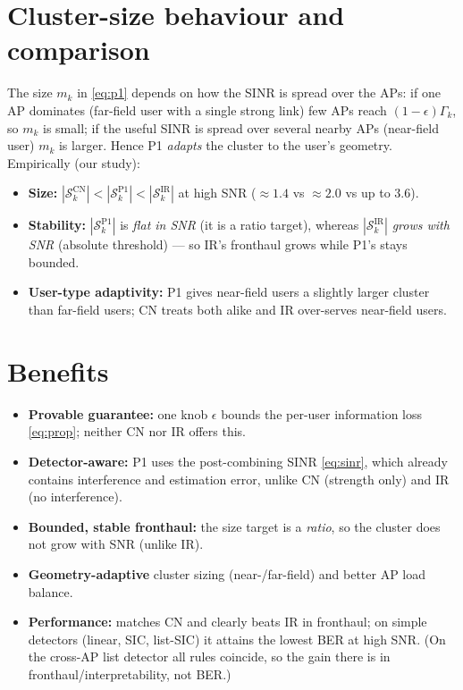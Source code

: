 \documentclass[11pt]{article}
\newcommand{\Sk}{\mathcal{S}_k}\newcommand{\E}{\mathbb{E}}
\begin{document}
\section{Cluster-size behaviour and comparison}
The size $m_{k}$ in \eqref{eq:p1} depends on how the SINR is spread over the APs: if one AP dominates
(far-field user with a single strong link) few APs reach $(1-\epsilon)\Gamma_{k}$, so $m_{k}$ is
small; if the useful SINR is spread over several nearby APs (near-field user) $m_{k}$ is larger.
Hence P1 \emph{adapts} the cluster to the user's geometry. Empirically (our study):
\begin{itemize}[leftmargin=1.4em,itemsep=1pt]
\item \textbf{Size:} $|\Sk^{\mathrm{CN}}|<|\Sk^{\mathrm{P1}}|<|\Sk^{\mathrm{IR}}|$ at high SNR
      ($\approx1.4$ vs $\approx2.0$ vs up to $3.6$).
\item \textbf{Stability:} $|\Sk^{\mathrm{P1}}|$ is \emph{flat in SNR} (it is a ratio target), whereas
      $|\Sk^{\mathrm{IR}}|$ \emph{grows with SNR} (absolute threshold) --- so IR's fronthaul grows
      while P1's stays bounded.
\item \textbf{User-type adaptivity:} P1 gives near-field users a slightly larger cluster than
      far-field users; CN treats both alike and IR over-serves near-field users.
\end{itemize}

\section{Benefits}
\begin{itemize}[leftmargin=1.4em,itemsep=1pt]
\item \textbf{Provable guarantee:} one knob $\epsilon$ bounds the per-user information loss
      \eqref{eq:prop}; neither CN nor IR offers this.
\item \textbf{Detector-aware:} P1 uses the post-combining SINR \eqref{eq:sinr}, which already contains
      interference and estimation error, unlike CN (strength only) and IR (no interference).
\item \textbf{Bounded, stable fronthaul:} the size target is a \emph{ratio}, so the cluster does not
      grow with SNR (unlike IR).
\item \textbf{Geometry-adaptive} cluster sizing (near-/far-field) and better AP load balance.
\item \textbf{Performance:} matches CN and clearly beats IR in fronthaul; on simple detectors
      (linear, SIC, list-SIC) it attains the lowest BER at high SNR. (On the cross-AP list detector
      all rules coincide, so the gain there is in fronthaul/interpretability, not BER.)
\end{itemize}
\end{document}

